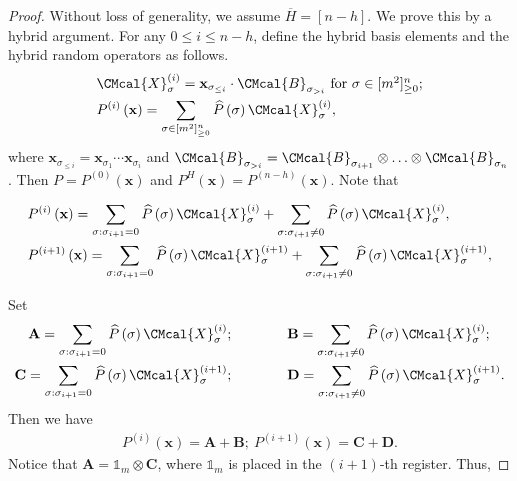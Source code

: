 \documentclass[11pt]{article}
\def\B{\CMcal{B}}
\def\X{\CMcal{X}}
\theoremstyle{plain}
\theoremstyle{definition}
\newcommand {\br} [1] {\ensuremath{ \left( #1 \right) }}
\newcommand {\id} {\ensuremath{\mathds{1}}}
\newcommand{\randx}{\ensuremath{\mathbf{x}}}
\newcommand{\1}{\mathbb{1}} %
\begin{document}
\begin{proof}
Without loss of generality, we assume $\overline{H}=[n-h]$. We prove this by a hybrid argument. For any $0\leq i\leq n-h$, define the hybrid basis elements and the hybrid random operators as follows.
	\begin{align}
	&\X_{\sigma}^{\br{i}}=\randx_{\sigma_{\leq i}}\cdot\B_{\sigma_{>i}}~\mbox{for $\sigma\in[m^2]_{\geq 0}^n$};\label{eqn:hybridxi}\\
	&P^{\br{i}}\br{\randx}=\sum_{\sigma\in[m^2]^n_{\geq0}}\widehat{P}\br{\sigma}\X^{\br{i}}_{\sigma},\label{eqn:hybridmi}
	\end{align}
where $\randx_{\sigma_{\leq i}}=\randx_{\sigma_1}\cdots\randx_{\sigma_i}$
and $\B_{\sigma_{>i}}=\B_{\sigma_{i+1}}\otimes\ldots\otimes\B_{\sigma_n}$.
Then $P=P^{(0)}\br{\randx}$ and $P^{H}\br{\randx}=P^{(n-h)}\br{\randx}$. Note that
	
	
	\begin{align*}
	&P^{\br{i}}\br{\randx}=\sum_{\sigma:\sigma_{i+1}=0}\widehat{P}\br{\sigma}\X_{\sigma}^{\br{i}}+\sum_{\sigma:\sigma_{i+1}\neq 0}\widehat{P}\br{\sigma}\X_{\sigma}^{\br{i}},\\
	&P^{\br{i+1}}\br{\randx}=\sum_{\sigma:\sigma_{i+1}= 0}\widehat{P}\br{\sigma}\X_{\sigma}^{\br{i+1}}+\sum_{\sigma:\sigma_{i+1}\neq 0}\widehat{P}\br{\sigma}\X_{\sigma}^{\br{i+1}},
	\end{align*}

	Set
	\begin{align*}
	\mathbf{A}=\sum_{\sigma:\sigma_{i+1}=0}\widehat{P}\br{\sigma}\X_{\sigma}^{\br{i}}; \quad\quad\quad\quad
	&\mathbf{B}=\sum_{\sigma:\sigma_{i+1}\neq 0}\widehat{P}\br{\sigma}\X_{\sigma}^{\br{i}};\\
\mathbf{C}=\sum_{\sigma:\sigma_{i+1}=0}\widehat{P}\br{\sigma}\X_{\sigma}^{\br{i+1}};\quad\quad\quad\quad
	&\mathbf{D}=\sum_{\sigma:\sigma_{i+1}\neq 0}\widehat{P}\br{\sigma}\X_{\sigma}^{\br{i+1}}.
	\end{align*}
	Then we have
	\begin{align*}
	P^{\br{i}}\br{\randx}=\mathbf{A}+\mathbf{B};~P^{\br{i+1}}\br{\randx}=\mathbf{C}+\mathbf{D}.
	\end{align*}
Notice that $\mathbf{A}=\id_m\otimes\mathbf{C}$, where $\id_m$ is placed in the $(i+1)$-th register. Thus,


\end{proof}
\end{document}
